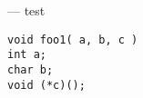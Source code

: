 \startmanpage
{}
--- test  
\startvb\begin{verbatim}
void foo1( a, b, c )
int a;
char b;
void (*c)();
\end{verbatim}
\endvb

\endmanpage
